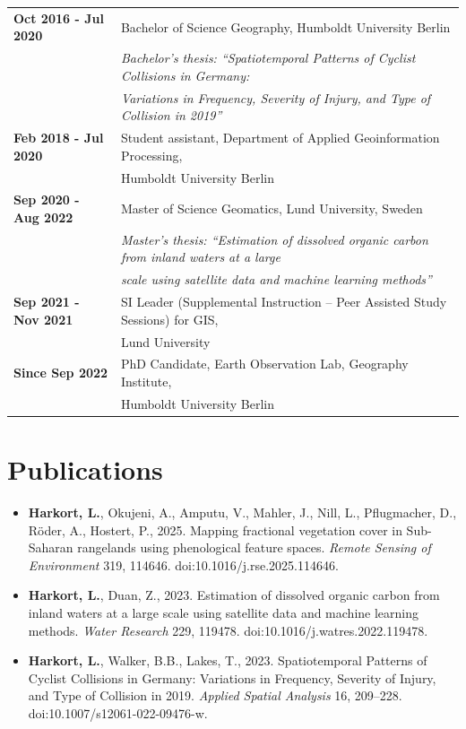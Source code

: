 \documentclass[10pt]{article} %
\begin{document}
\begin{tabular}{@{}>{\bfseries}p{3.3cm} l}
Oct 2016 - Jul 2020 & Bachelor of Science Geography, Humboldt University Berlin\\
[0.1cm]
& \it Bachelor's thesis: ``Spatiotemporal Patterns of Cyclist Collisions in Germany:\\
[0.1cm]
& \it Variations in Frequency, Severity of Injury, and Type of Collision in 2019''\\
[0.2cm]
Feb 2018 - Jul 2020 & Student assistant, Department of Applied Geoinformation Processing,\\
[0.1cm]
& Humboldt University Berlin\\
[0.2cm]
Sep 2020 - Aug 2022 & Master of Science Geomatics, Lund University, Sweden\\
[0.1cm]
& \it Master's thesis: ``Estimation of dissolved organic carbon from inland waters at a large\\
[0.1cm]
& \it scale using satellite data and machine learning methods''\\
[0.2cm]
Sep 2021 - Nov 2021 & SI Leader (Supplemental Instruction -- Peer Assisted Study Sessions) for GIS,\\
[0.1cm]
& Lund University\\
[0.2cm]
Since Sep 2022 & PhD Candidate, Earth Observation Lab, Geography Institute,\\
[0.1cm]
& Humboldt University Berlin\\
\end{tabular}


\vspace{6mm}
\section{Publications}

\begin{itemize}[leftmargin=0.3cm, itemsep=6pt]
\item \textbf{Harkort, L.}, Okujeni, A., Amputu, V., Mahler, J., Nill, L., Pflugmacher, D., Röder, A., Hostert, P., 2025. Mapping fractional vegetation cover in Sub-Saharan rangelands using phenological feature spaces. \textit{Remote Sensing of Environment} 319, 114646. doi:10.1016/j.rse.2025.114646.
\item \textbf{Harkort, L.}, Duan, Z., 2023. Estimation of dissolved organic carbon from inland waters at a large scale using satellite data and machine learning methods. \textit{Water Research} 229, 119478. doi:10.1016/j.watres.2022.119478.
\item \textbf{Harkort, L.}, Walker, B.B., Lakes, T., 2023. Spatiotemporal Patterns of Cyclist Collisions in Germany: Variations in Frequency, Severity of Injury, and Type of Collision in 2019. \textit{Applied Spatial Analysis} 16, 209--228. doi:10.1007/s12061-022-09476-w.
\end{itemize}
\end{document}
